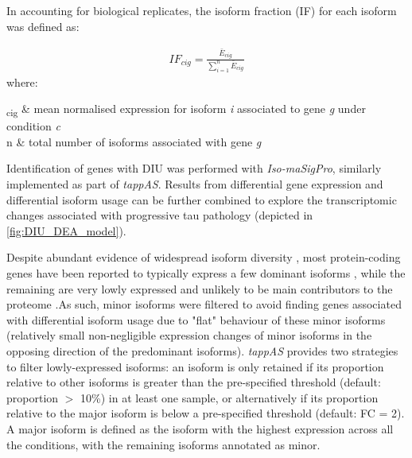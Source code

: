 In accounting for biological replicates, the isoform fraction (IF) for each isoform was defined as:

\begin{myequation}[!h]
	\begin{align}
	IF_{cig} = \frac{\bar{E}_{cig}}{\sum_{i=1}^{n}\bar{E}_{cig}}
	\end{align}
	where:
	\begin{conditions*}
		\hspace{3mm}\textsubscript{cig} & mean normalised expression for isoform \textit{i} associated to gene \textit{g} under condition \textit{c}\\
		\hspace{3mm}n  & total number of isoforms associated with gene \textit{g}
	\end{conditions*}
	\captionsetup{width=0.95\textwidth}
	\caption[Calculation of isoform fraction for differential isoform usage analysis]%
	{\textbf{Calculation of isoform fraction for differential isoform usage analysis}. Equation is adopted from \textit{tappAS}}    
\end{myequation}

Identification of genes with DIU was performed with \textit{Iso-maSigPro}\cite{Nueda2018}, similarly implemented as part of \textit{tappAS}. Results from differential gene expression and differential isoform usage can be further combined to explore the transcriptomic changes associated with progressive tau pathology (depicted in \cref{fig:DIU_DEA_model}).  

Despite abundant evidence of widespread isoform diversity \cite{Wang2008}, most protein-coding genes have been reported to typically express a few dominant isoforms \cite{Gonzalez-Porta2013, Ezkurdia2015}, while the remaining are very lowly expressed and unlikely to be main contributors to the proteome \cite{Gonzalez-Porta2013}.As such, minor isoforms were filtered to avoid finding genes associated with differential isoform usage due to "flat" behaviour of these minor isoforms \cite{DeLaFuente2020} (relatively small non-negligible expression changes of minor isoforms in the opposing direction of the predominant isoforms). \textit{tappAS} provides two strategies to filter lowly-expressed isoforms: an isoform is only retained if its proportion relative to other isoforms is greater than the pre-specified threshold (default: proportion $>$ 10\%) in at least one sample, or alternatively if its proportion relative to the major isoform is below a pre-specified threshold (default: FC = 2). A major isoform is defined as the isoform with the highest expression across all the conditions, with the remaining isoforms annotated as minor. 

